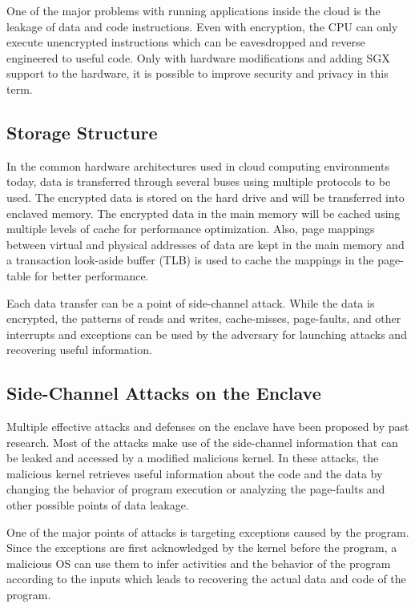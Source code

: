 One of the major problems with running applications inside the cloud is the leakage of data and code instructions. Even with encryption, the CPU can only execute unencrypted instructions which can be eavesdropped and reverse engineered to useful code. Only with hardware modifications and adding SGX support to the hardware, it is possible to improve security and privacy in this term.

\subsection{Storage Structure}

In the common hardware architectures used in cloud computing environments today, data is transferred through several buses using multiple protocols to be used. The encrypted data is stored on the hard drive and will be transferred into enclaved memory. The encrypted data in the main memory will be cached using multiple levels of cache for performance optimization. Also, page mappings between virtual and physical addresses of data are kept in the main memory and a transaction look-aside buffer (TLB) is used to cache the mappings in the page-table for better performance.

Each data transfer can be a point of side-channel attack. While the data is encrypted, the patterns of reads and writes, cache-misses, page-faults, and other interrupts and exceptions can be used by the adversary for launching attacks and recovering useful information.

\subsection{Side-Channel Attacks on the Enclave}

Multiple effective attacks and defenses on the enclave have been proposed by past research. Most of the attacks make use of the side-channel information that can be leaked and accessed by a modified malicious kernel. In these attacks, the malicious kernel retrieves useful information about the code and the data by changing the behavior of program execution or analyzing the page-faults and other possible points of data leakage.

One of the major points of attacks is targeting exceptions caused by the program. Since the exceptions are first acknowledged by the kernel before the program, a malicious OS can use them to infer activities and the behavior of the program according to the inputs which leads to recovering the actual data and code of the program.


